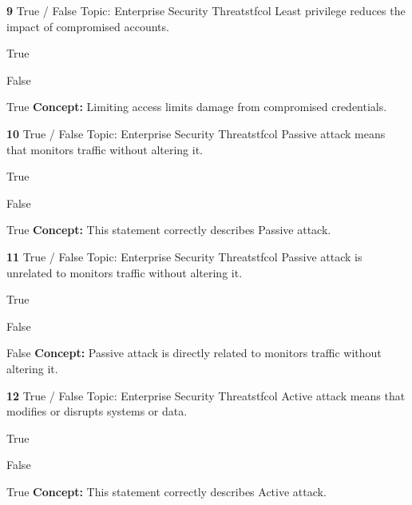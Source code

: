 \documentclass[10pt,a4paper]{article}
\begin{document}
\begin{qcard}{\color{white}\textbf{9} \hfill \small True / False \textbar{} Topic: Enterprise Security Threats}{tfcol}
Least privilege reduces the impact of compromised accounts.

\begin{qoptions}
\item True
\item False
\end{qoptions}
\begin{explainbox}{True}
\textbf{Concept:} Limiting access limits damage from compromised credentials.
\end{explainbox}
\end{qcard}

\begin{qcard}{\color{white}\textbf{10} \hfill \small True / False \textbar{} Topic: Enterprise Security Threats}{tfcol}
Passive attack means that monitors traffic without altering it.

\begin{qoptions}
\item True
\item False
\end{qoptions}
\begin{explainbox}{True}
\textbf{Concept:} This statement correctly describes Passive attack.
\end{explainbox}
\end{qcard}

\begin{qcard}{\color{white}\textbf{11} \hfill \small True / False \textbar{} Topic: Enterprise Security Threats}{tfcol}
Passive attack is unrelated to monitors traffic without altering it.

\begin{qoptions}
\item True
\item False
\end{qoptions}
\begin{explainbox}{False}
\textbf{Concept:} Passive attack is directly related to monitors traffic without altering it.
\end{explainbox}
\end{qcard}

\begin{qcard}{\color{white}\textbf{12} \hfill \small True / False \textbar{} Topic: Enterprise Security Threats}{tfcol}
Active attack means that modifies or disrupts systems or data.

\begin{qoptions}
\item True
\item False
\end{qoptions}
\begin{explainbox}{True}
\textbf{Concept:} This statement correctly describes Active attack.
\end{explainbox}
\end{qcard}
\end{document}
